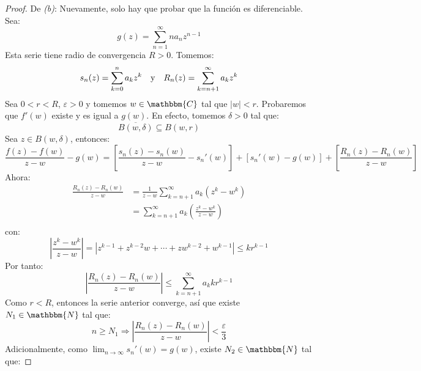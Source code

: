 \documentclass[12pt]{report}
\newcounter{it}
\theoremstyle{largebreak}
\newcommand\abs[1]{\ensuremath{\left|#1\right|}}
\newcommand{\bbm}[1]{\ensuremath{\mathbbm{#1}}}
\begin{document}
\begin{proof}
        De \textit{(b)}: Nuevamente, solo hay que probar que la función es diferenciable. Sea:
        \begin{equation*}
            g(z)=\sum_{ n=1}^\infty na_nz^{ n-1}
        \end{equation*}
        Esta serie tiene radio de convergencia $R>0$. Tomemos:
        \begin{equation*}
            s_n(z)=\sum_{ k=0}^n a_kz^k\quad\textup{y}\quad R_n(z)=\sum_{ k=n+1}^\infty a_kz^k
        \end{equation*}
        Sea $0<r<R$, $\varepsilon>0$ y tomemos $w\in\bbm{C}$ tal que $\abs{w}<r$. Probaremos que $f'(w)$ existe y es igual a $g(w)$. En efecto, tomemos $\delta>0$ tal que:
        \begin{equation*}
            \overline{B(w,\delta)}\subseteq B(w,r)
        \end{equation*}
        Sea $z\in B(w,\delta)$, entonces:
        \begin{equation*}
            \frac{f(z)-f(w)}{z-w}-g(w)=\left[\frac{s_n(z)-s_n(w)}{z-w}-s_n'(w) \right]+[s_n'(w)-g(w)]+\left[\frac{R_n(z)-R_n(w)}{z-w}\right] 
        \end{equation*}
        Ahora:
        \begin{equation*}
            \begin{split}
                \frac{R_n(z)-R_n(w)}{z-w}&=\frac{1}{z-w}\sum_{ k=n+1}^\infty a_k(z^k-w^k)\\
                &=\sum_{ k=n+1}^\infty a_k\left(\frac{z^k-w^k}{z-w} \right)\\
            \end{split}
        \end{equation*}
        con:
        \begin{equation*}
            \abs{\frac{z^k-w^k}{z-w}}=\abs{z^{k-1}+z^{k-2}w+\cdots+zw^{ k-2}+w^{ k-1} }\leq kr^{ k-1}
        \end{equation*}
        Por tanto:
        \begin{equation*}
            \abs{\frac{R_n(z)-R_n(w)}{z-w}}\leq\sum_{ k=n+1}^\infty a_kkr^{ k-1}
        \end{equation*}
        Como $r<R$, entonces la serie anterior converge, así que existe $N_1\in\bbm{N}$ tal que:
        \begin{equation*}
            n\geq N_1\Rightarrow \abs{\frac{R_n(z)-R_n(w)}{z-w}}<\frac{\varepsilon}{3}
        \end{equation*}
        Adicionalmente, como $\lim_{ n\rightarrow\infty }s_n'(w)=g(w)$, existe $N_2\in\bbm{N}$ tal que:

\end{proof}
\end{document}
